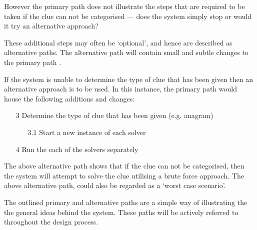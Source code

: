 However the primary path does not illustrate the steps that are required to be 
taken if the clue can not be categorised --- does the system simply stop or 
would it try an alternative approach?

These additional steps may often be `optional', and hence are described as 
alternative paths. The alternative path will contain small and subtle changes 
to the primary path \citep{lunn03}.

If the system is unable to determine the type of clue that has been given then 
an alternative approach is to be used. In this instance, the primary path would 
house the following additions and changes:

\begin{enumerate}
  \item[3] Determine the type of clue that has been given (e.g. anagram)
  \begin{enumerate}
    \item[3.1] Start a new instance of each solver
  \end{enumerate}
  \item[4] Run the each of the solvers separately
\end{enumerate}

The above alternative path shows that if the clue can not be categorised, then 
the system will attempt to solve the clue utilising a brute force approach. The 
above alternative path, could also be regarded as a `worst case scenario'.

The outlined primary and alternative paths are a simple way of illustrating the 
the general ideas behind the system. These paths will be actively referred to 
throughout the design process.
